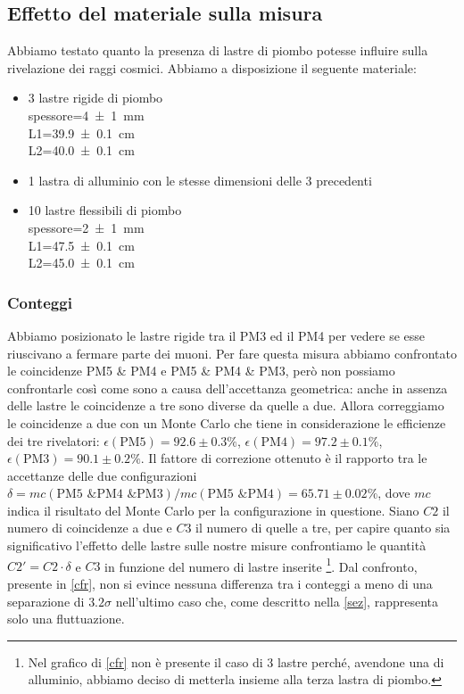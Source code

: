 
\subsection{Effetto del materiale sulla misura}

Abbiamo testato quanto la presenza di lastre di piombo potesse influire sulla rivelazione dei raggi cosmici. Abbiamo a disposizione il seguente materiale:
\begin{itemize}

\item 3 lastre rigide di piombo\\
spessore=\SI{4\pm1}{mm}\\
L1=\SI{39.9\pm0.1}{ cm}\\
L2=\SI{40.0\pm0.1}{cm}

\item 1 lastra di alluminio con le stesse dimensioni delle 3 precedenti

\item 10 lastre flessibili di piombo\\
spessore=\SI{2\pm1}{ mm}\\
L1=\SI{47.5\pm0.1}{ cm}\\
L2=\SI{45.0\pm0.1}{ cm}

\end{itemize}

\subsubsection{Conteggi}

Abbiamo posizionato le lastre rigide tra il PM3 ed il PM4 per vedere se esse riuscivano a fermare parte dei muoni. Per fare questa misura abbiamo confrontato le coincidenze  PM5 \& PM4 e PM5 \& PM4 \& PM3, però non possiamo confrontarle così come sono a causa dell'accettanza geometrica: anche in assenza delle lastre le coincidenze a tre sono diverse da quelle a due. Allora correggiamo le coincidenze a due con un Monte Carlo che tiene in considerazione le efficienze dei tre rivelatori: $\epsilon(\text{PM5})=92.6\pm0.3\%$, $\epsilon(\text{PM4})=97.2\pm0.1\%$, $\epsilon(\text{PM3})=90.1\pm0.2\%$. Il fattore di correzione ottenuto è il rapporto tra le accettanze delle due configurazioni  $\delta=mc(\text{PM5 \& PM4 \&PM3})/mc(\text{PM5 \& PM4})=65.71\pm0.02\%$, dove $mc$ indica il risultato del Monte Carlo per la configurazione in questione. Siano $C2$ il numero di coincidenze a due e $C3$ il numero di quelle a tre, per capire quanto sia significativo l'effetto delle lastre sulle nostre misure confrontiamo le quantità $C2'=C2 \cdot \delta$ e $C3$ in funzione del numero di lastre inserite%
\footnote{Nel grafico di \autoref{cfr} non è presente il caso di 3 lastre perché, avendone una di alluminio, abbiamo deciso di metterla insieme alla terza lastra di piombo.}. %
Dal confronto, presente in \autoref{cfr}, non si evince nessuna differenza tra i conteggi a meno di una separazione di $3.2\sigma$ nell'ultimo caso che, come descritto nella \autoref{sez}, rappresenta solo una fluttuazione.

